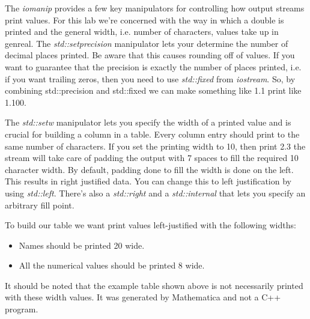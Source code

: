 \documentclass[nobib]{tufte-handout}
\begin{document}
The \textit{iomanip} provides a few key manipulators for controlling how output streams print values. For this lab we're concerned with the way in which a double is printed and the general width, i.e. number of characters, values take up in genreal. The \textit{std::setprecision} manipulator lets your determine the number of decimal places printed. Be aware that this causes rounding off of values.  If you want to guarantee that the precision is exactly the number of places printed, i.e. if you want trailing zeros, then you need to use \textit{std::fixed} from \textit{iostream}.  So, by combining std::precision and std::fixed we can make something like 1.1 print like 1.100. 


The \textit{std::setw}  manipulator lets you specify the width of a printed value and is crucial for building a column in a table. Every column entry should print to the same number of characters. If you set the printing width to 10, then print 2.3 the stream will take care of padding the output with 7 spaces to fill the required 10 character width. By default, padding done to fill the width is done on the left. This results in right justified data. You can change this to left justification by using \textit{std::left}. There's also a \textit{std::right} and a \textit{std::internal} that lets you specify an arbitrary fill point.

To build our table we want print values left-justified with the following widths: 
\begin{itemize}
\item Names should be printed 20 wide.
\item All the numerical values should be printed 8 wide.
\end{itemize}
It should be noted that the example table shown above is not necessarily printed with these width values. It was generated by Mathematica and not a C++ program.  
\end{document}
